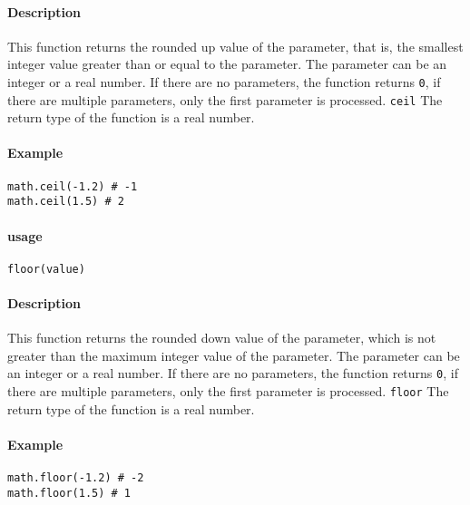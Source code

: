 \paragraph{Description}
This function returns the rounded up value of the parameter, that is, the smallest integer value greater than or equal to the parameter. The parameter can be an integer or a real number. If there are no parameters, the function returns \texttt{0}, if there are multiple parameters, only the first parameter is processed. \texttt{ceil} The return type of the function is a real number.

\paragraph{Example}
\begin{lstlisting}[language=berry, numbers=none]
math.ceil(-1.2) # -1
math.ceil(1.5) # 2
\end{lstlisting}


\paragraph{usage}
\begin{lstlisting}[language=berry, numbers=none]
floor(value)
\end{lstlisting}

\paragraph{Description}
This function returns the rounded down value of the parameter, which is not greater than the maximum integer value of the parameter. The parameter can be an integer or a real number. If there are no parameters, the function returns \texttt{0}, if there are multiple parameters, only the first parameter is processed. \texttt{floor} The return type of the function is a real number.

\paragraph{Example}
\begin{lstlisting}[language=berry, numbers=none]
math.floor(-1.2) # -2
math.floor(1.5) # 1
\end{lstlisting}


